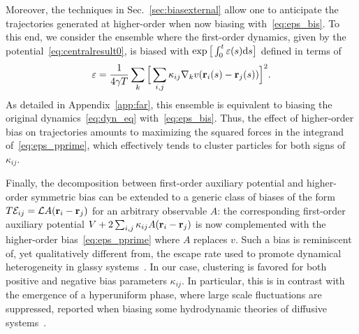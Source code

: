 \documentclass[superscriptaddress, twocolumn, prx, longbibliography, nofootinbib]{revtex4-1}
\begin{document}
Moreover, the techniques in Sec.~\ref{sec:biasexternal} allow one to anticipate the trajectories generated at higher-order when now biasing with~\eqref{eq:eps_bis}. To this end, we consider the ensemble where the first-order dynamics, given by the potential~\eqref{eq:centralresult0}, is biased with $\exp\big[\int_0^t \varepsilon(s){\rm d}s\big]$ defined in terms of
\begin{equation}\label{eq:eps_pprime}
	\varepsilon = \frac{1}{4\gamma T}\sum_k\Big[\sum_{i,j}\kappa_{ij} \nabla_kv({\bf r}_i(s)-{\bf r}_j(s))\Big]^2 .
\end{equation}
As detailed in Appendix~\ref{app:far}, this ensemble is equivalent to biasing the original dynamics~\eqref{eq:dyn_eq} with~\eqref{eq:eps_bis}. Thus, the effect of higher-order bias on trajectories amounts to maximizing the squared forces in the integrand of~\eqref{eq:eps_pprime}, which effectively tends to cluster particles for both signs of $\kappa_{ij}$.


Finally, the decomposition between first-order auxiliary potential and higher-order symmetric bias can be extended to a generic class of biases of the form $T{\cal E}_{ij} = {\cal L} A({\bf r}_i-{\bf r}_j)$ for an arbitrary observable $A$: the corresponding first-order auxiliary potential $V+2\sum_{i,j}\kappa_{ij}A({\bf r}_i-{\bf r}_j)$ is now complemented with the higher-order bias~\eqref{eq:eps_pprime} where $A$ replaces $v$. Such a bias is reminiscent of, yet qualitatively different from, the escape rate used to promote dynamical heterogeneity in glassy systems~\cite{Pitard2011, Fullerton2013}. In our case, clustering is favored for both positive and negative bias parameters $\kappa_{ij}$. In particular, this is in contrast with the emergence of a hyperuniform phase, where large scale fluctuations are suppressed, reported when biasing some hydrodynamic theories of diffusive systems~\cite{Jack2015b}.



\end{document}
